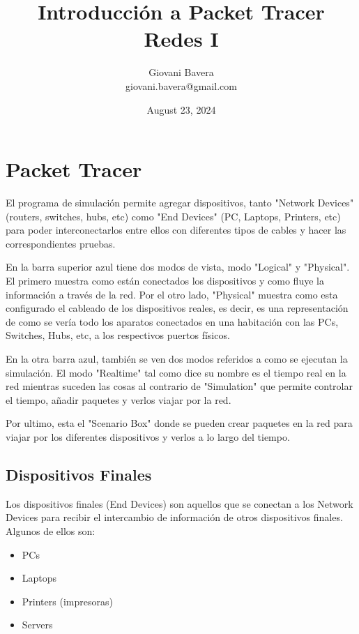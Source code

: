 \documentclass{article}
\title{Introducción a Packet Tracer \\ Redes I}
\author{Giovani Bavera \\ giovani.bavera@gmail.com}
\date{August 23, 2024}
\begin{document}
\maketitle

\section{Packet Tracer}

El programa de simulación permite agregar dispositivos, tanto "Network Devices" (routers, switches, hubs, etc) como "End Devices" (PC, Laptops, Printers, etc) para poder interconectarlos entre ellos con diferentes tipos de cables y hacer las correspondientes pruebas. 

En la barra superior azul tiene dos modos de vista, modo "Logical" y "Physical". El primero muestra como están conectados los dispositivos y como fluye la información a través de la red. Por el otro lado, "Physical" muestra como esta configurado el cableado de los dispositivos reales, es decir, es una representación de como se vería todo los aparatos conectados en una habitación con las PCs, Switches, Hubs, etc, a los respectivos puertos físicos. 

En la otra barra azul, también se ven dos modos referidos a como se ejecutan la simulación. El modo "Realtime" tal como dice su nombre es el tiempo real en la red mientras suceden las cosas al contrario de "Simulation" que permite controlar el tiempo, añadir paquetes y verlos viajar por la red. 

Por ultimo, esta el "Scenario Box" donde se pueden crear paquetes en la red para viajar por los diferentes dispositivos y verlos a lo largo del tiempo. 

\subsection{Dispositivos Finales}

Los dispositivos finales (End Devices) son aquellos que se conectan a los Network Devices para recibir el intercambio de información de otros dispositivos finales. Algunos de ellos son:

\begin{itemize}
  \item PCs
  \item Laptops
  \item Printers (impresoras)
  \item Servers
\end{itemize}
\end{document}
